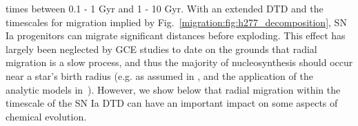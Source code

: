 times between 0.1 - 1 Gyr and 1 - 10 Gyr. 
With an extended DTD and the timescales for migration implied by 
Fig.~\ref{migration:fig:h277_decomposition}, SN Ia progenitors can migrate significant 
distances before exploding. 
This effect has largely been neglected by GCE studies to date on the grounds 
that radial migration is a slow process, and thus the majority of 
nucleosynthesis should occur near a star's birth radius (e.g. as assumed in 
\citealp{Minchev2013}, and the application of the~\citealp*{Weinberg2017b} 
analytic models in~\citealp{Feuillet2018}). 
However, we show below that radial migration within the timescale of the SN Ia 
DTD can have an important impact on some aspects of chemical evolution. 



